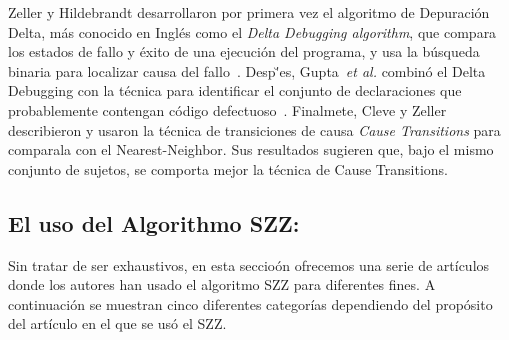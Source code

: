 \documentclass[a4paper, 12pt]{book}
\begin{document}
Zeller y Hildebrandt desarrollaron por primera vez el algoritmo de Depuraci\'on Delta, m\'as conocido en Ingl\'es como el \emph{Delta Debugging algorithm}, que compara los estados de fallo y \'exito de una ejecuci\'on del  programa, y usa la b\'usqueda binaria para localizar causa del fallo~\cite{zeller2002simplifying}. Desp\u'es, Gupta~\textit{et al.} combin\'o el Delta Debugging
con la  t\'ecnica para identificar el conjunto de declaraciones que probablemente contengan c\'odigo defectuoso~\cite{gupta2005locating}. Finalmete, Cleve y Zeller~\cite{cleve2005locating} describieron y usaron la t\'ecnica de transiciones de causa \emph{Cause Transitions} para comparala con el Nearest-Neighbor. Sus resultados sugieren que, bajo el mismo conjunto de sujetos, se comporta mejor la t\'ecnica de Cause Transitions.


\subsection{El uso del Algorithmo SZZ:}
\label{subsec:SZZuso}


Sin tratar de ser exhaustivos, en esta seccio\'on ofrecemos una serie de art\'iculos donde los autores han usado el algoritmo SZZ para diferentes fines. A continuaci\'on se muestran cinco diferentes categor\'ias dependiendo del prop\'osito del art\'iculo en el que se us\'o el SZZ.
\end{document}
